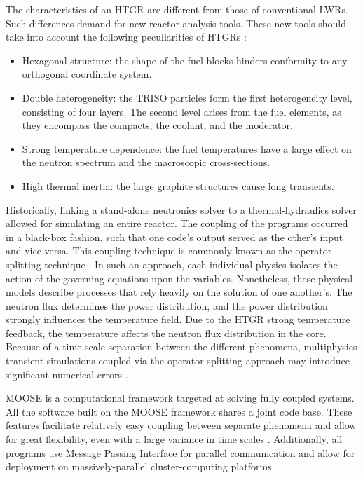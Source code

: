 The characteristics of an \gls{HTGR} are different from those of conventional \glspl{LWR}.
Such differences demand for new reactor analysis tools.
These new tools should take into account the following peculiarities of \glspl{HTGR} \cite{rohde_development_2012}\cite{bostelmann_criticality_2016}:
\begin{itemize}
\item Hexagonal structure: the shape of the fuel blocks hinders conformity to any orthogonal coordinate system.
\item Double heterogeneity: the TRISO particles form the first heterogeneity level, consisting of four
layers.
The second level arises from the fuel elements, as they encompass the compacts, the coolant, and the moderator.
\item Strong temperature dependence: the fuel temperatures have a large effect on the neutron spectrum and the macroscopic cross-sections.
\item High thermal inertia: the large graphite structures cause long transients.
\end{itemize}

Historically, linking a stand-alone neutronics solver to a thermal-hydraulics solver allowed for simulating an entire reactor.
The coupling of the programs occurred in a black-box fashion, such that one code's output served as the other's input and vice versa.
This coupling technique is commonly known as the operator-splitting technique \cite{ragusa_consistent_2009}.
In such an approach, each individual physics isolates the action of the governing equations upon the variables.
Nonetheless, these physical models describe processes that rely heavily on the solution of one another's.
The neutron flux determines the power distribution, and the power distribution strongly influences the temperature field.
Due to the \gls{HTGR} strong temperature feedback, the temperature affects the neutron flux distribution in the core.
Because of a time-scale separation between the different phenomena, multiphysics transient simulations coupled via the operator-splitting approach may introduce significant numerical errors \cite{ragusa_consistent_2009} \cite{park_tightly_2010}.

\gls{MOOSE} \cite{gaston_moose_2009} is a computational framework targeted at solving fully coupled systems.
All the software built on the \gls{MOOSE} framework shares a joint code base.
These features facilitate relatively easy coupling between separate phenomena and allow for great flexibility, even with a large variance in time scales \cite{novak_pronghorn_2018}.
Additionally, all programs use Message Passing Interface for parallel communication and allow for deployment on massively-parallel cluster-computing platforms.

